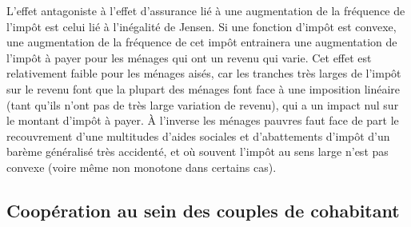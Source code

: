 L'effet antagoniste à l'effet d'assurance lié à une augmentation de la fréquence de l'impôt est celui lié à l'inégalité de Jensen. Si une fonction d'impôt est convexe, une augmentation de la fréquence de cet impôt entrainera une augmentation de l'impôt à payer pour les ménages qui ont un revenu qui varie. Cet effet est relativement faible pour les ménages aisés, car les tranches très larges de l'impôt sur le revenu font que la plupart des ménages font face à une imposition linéaire (tant qu'ils n'ont pas de très large variation de revenu), qui a un impact nul sur le montant d'impôt à payer. À l'inverse les ménages pauvres faut face de part le recouvrement d'une multitudes d'aides sociales et d'abattements d'impôt d'un barème généralisé très accidenté, et où souvent l'impôt au sens large n'est pas convexe (voire même non monotone dans certains cas).




 \subsection{Coopération au sein des couples de cohabitant}

